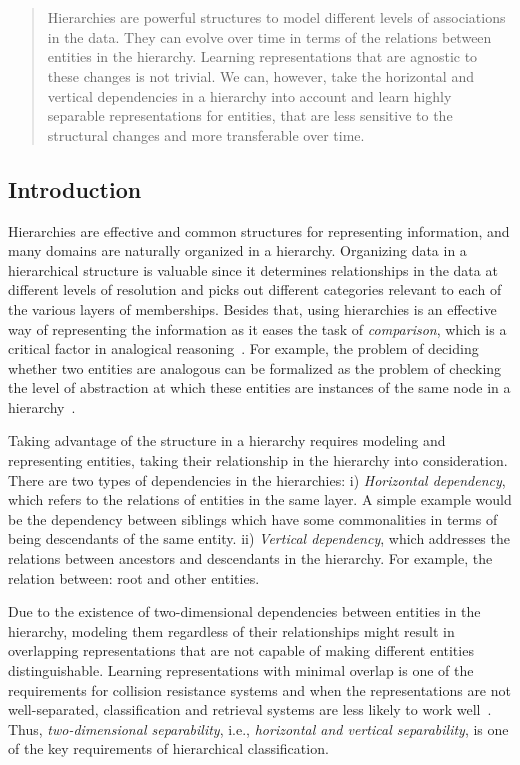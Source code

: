 \chapter{}
\label{chap:3}
%
\begin{quote}
Hierarchies are powerful structures to model different levels of associations in the data. They can evolve over time in terms of the relations between entities in the hierarchy. Learning representations that are agnostic to these changes is not trivial. We can, however, take the horizontal and vertical dependencies in a hierarchy into account and learn highly separable representations for entities, that are less sensitive to the structural changes and more transferable over time. 
\end{quote}
%
\section{Introduction}
Hierarchies are effective and common structures for representing information, and many domains are naturally organized in a hierarchy. Organizing data in a hierarchical structure is valuable since it determines relationships in the data at different levels of resolution and picks out different categories relevant to each of the various layers of memberships.
Besides that, using hierarchies is an effective way of representing the information as it eases the task of \emph{comparison}, which is a critical factor in analogical reasoning~\citep{holyoak2012analogy}. For example, the problem of deciding whether two entities are analogous can be formalized as the problem of checking the level of abstraction at which these entities are instances of the same node in a hierarchy~\citep{abrantes1999analogical}.

Taking advantage of the structure in a hierarchy requires modeling and representing entities, taking their relationship in the hierarchy into consideration. 
There are two types of dependencies in the hierarchies: i) \emph{Horizontal dependency}, which refers to the relations of entities in the same layer.  A simple example would be the dependency between siblings which have some commonalities in terms of being descendants of the same entity. ii) \emph{Vertical dependency}, which addresses the relations between ancestors and descendants in the hierarchy. For example, the relation between: root and other entities. 

Due to the existence of two-dimensional dependencies between entities in the hierarchy, modeling them regardless of their relationships might result in overlapping representations that are not capable of making different entities distinguishable.  Learning representations with minimal overlap is one of the requirements for collision resistance systems and when the representations are not well-separated, classification and retrieval systems are less likely to work well~\citep{Lewis:1992}. 
Thus, \emph{two-dimensional separability}, i.e., \emph{horizontal and vertical separability}, is one of the key requirements of hierarchical classification.

